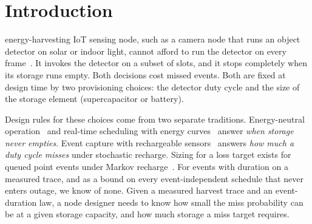 \documentclass[lettersize,journal]{IEEEtran}
\theoremstyle{definition}
\theoremstyle{remark}
\begin{document}
\section{Introduction}\label{sec:intro}
 energy-harvesting IoT sensing node, such as a camera node that runs an object detector on solar or indoor light, cannot afford to run the detector on every frame~\cite{yue2026iotj,vanleemput2023iotj}. It invokes the detector on a subset of slots, and it stops completely when its storage runs empty. Both decisions cost missed events. Both are fixed at design time by two provisioning choices: the detector duty cycle and the size of the storage element (supercapacitor or battery).

Design rules for these choices come from two separate traditions. Energy-neutral operation~\cite{kansal2007,buchli2014sensys,ahn2023iotj} and real-time scheduling with energy curves~\cite{moser2007rts} answer \emph{when storage never empties}. Event capture with rechargeable sensors~\cite{kar2006ton,jaggi2009wn,ren2014tpds,yau2010tosn} answers \emph{how much a duty cycle misses} under stochastic recharge. Sizing for a loss target exists for queued point events under Markov recharge~\cite{zhang2013twc,deng2022arxiv,tunc2017peva}. For events with duration on a measured trace, and as a bound on every event-independent schedule that never enters outage, we know of none. Given a measured harvest trace and an event-duration law, a node designer needs to know how small the miss probability can be at a given storage capacity, and how much storage a miss target requires.
\end{document}
